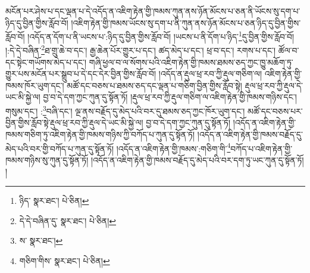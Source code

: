 མངོན་པར་ཤེས་པ་དང་ལྡན་པ་དེ་འདོད་ན་འཇིག་རྟེན་གྱི་ཁམས་ཀུན་ནས་ཉོན་མོངས་པ་ཅན་ནི་ཡོངས་སུ་དག་པ་ཉིད་དུ་བྱིན་གྱིས་རློབ་བོ། །འཇིག་རྟེན་གྱི་ཁམས་ཡོངས་སུ་དག་པ་ནི་ཀུན་ནས་ཉོན་མོངས་པ་ཅན་ཉིད་དུ་བྱིན་གྱིས་རློབ་བོ། །འདོད་ན་དོག་པ་ནི་ཡངས་པ་:ཉིད་དུ་བྱིན་གྱིས་རློབ་བོ། །ཡངས་པ་ནི་དོག་པ་ཉིད་\footnote{ཉིད་  སྣར་ཐང་།  པེ་ཅིན། }དུ་བྱིན་གྱིས་རློབ་བོ། །:དེ་དེ་བཞིན་\footnote{དེ་དེ་བཞིན་དུ་  སྣར་ཐང་།  པེ་ཅིན། }ཐ་གྲུ་ཆེ་བ་དང་། རྒྱ་ཆེན་པོར་གྱུར་པ་དང་། ཚད་མེད་པ་དང་། ཕྲ་བ་དང་། རགས་པ་དང་། ཚོལ་བ་དང་སྟེང་གཡོགས་མེད་པ་དང་། གཞི་ཕྱལ་བ་ལ་སོགས་པའི་འཇིག་རྟེན་གྱི་ཁམས་ཐམས་ཅད་ཀྱང་ཁྱུ་མཆོག་ཏུ་གྱུར་པས་མངོན་པར་སྒྲུབ་པ་དེ་དང་དེར་བྱིན་གྱིས་རློབ་བོ། །འདོད་ན་རྡུལ་ཕྲ་རབ་ཀྱི་རྡུལ་གཅིག་ལ། འཇིག་རྟེན་གྱི་ཁམས་ཁོར་ཡུག་དང་། མཚོ་དང་བཅས་པ་ཐམས་ཅད་དང་ལྡན་པ་གཅིག་བྱིན་གྱིས་རློབ་སྟེ། རྡུལ་ཕྲ་རབ་ཀྱི་རྡུལ་དེ་ཡང་མི་སྐྱེ་ལ། བྱ་བ་དེ་དག་ཀྱང་ཀུན་དུ་སྟོན་ཏོ། །རྡུལ་ཕྲ་རབ་ཀྱི་རྡུལ་གཅིག་ལ་འཇིག་རྟེན་གྱི་ཁམས་གཉིས་དང་། གསུམ་དང་། :\footnote{ས་  སྣར་ཐང་། }བཞི་དང་། ལྔ་ནས་བརྗོད་དུ་མེད་པའི་བར་དུ་ཐམས་ཅད་ཀྱང་ཁོར་ཡུག་དང་། མཚོ་དང་བཅས་པར་བྱིན་གྱིས་རློབ་སྟེ་རྡུལ་ཕྲ་རབ་ཀྱི་རྡུལ་དེ་ཡང་མི་སྐྱེ་ལ། བྱ་བ་དེ་དག་ཀྱང་ཀུན་དུ་སྟོན་ཏོ། །འདོད་ན་འཇིག་རྟེན་གྱི་ཁམས་གཅིག་ཏུ་འཇིག་རྟེན་གྱི་ཁམས་གཉིས་ཀྱི་བཀོད་པ་ཀུན་དུ་སྟོན་ཏོ། །འདོད་ན་འཇིག་རྟེན་གྱི་ཁམས་བརྗོད་དུ་མེད་པའི་བར་གྱི་བཀོད་པ་ཀུན་དུ་སྟོན་ཏོ། །འདོད་ན་འཇིག་རྟེན་གྱི་ཁམས་:གཅིག་གི་\footnote{གཅིག་གིས་  སྣར་ཐང་།  པེ་ཅིན། }བཀོད་པ་འཇིག་རྟེན་གྱི་ཁམས་གཉིས་སུ་ཀུན་དུ་སྟོན་ཏོ། །འདོད་ན་འཇིག་རྟེན་གྱི་ཁམས་བརྗོད་དུ་མེད་པའི་བར་དག་ཏུ་ཡང་ཀུན་དུ་སྟོན་ཏོ། །
